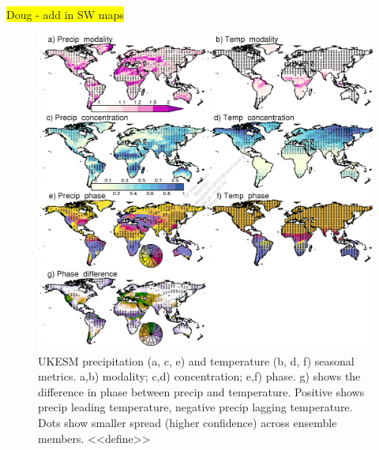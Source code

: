 \documentclass[bg, manuscript]{copernicus}
\newcommand{\hilight}[1]{\colorbox{yellow}{#1}}
\begin{document}
\hilight{Doug - add in SW maps}



\begin{figure}[t]
    \includegraphics[width=12cm]{figs/Climate/climStuff-UKESM.png}
    \caption{UKESM precipitation (a, c, e) and temperature (b, d, f) seasonal metrics. a,b) modality; c,d) concentration; e,f) phase. g) shows the difference in phase between precip and temperature. Positive shows precip leading temperature, negative precip lagging temperature. Dots show smaller spread (higher confidence) across ensemble members. <<define>>  \label{fig:ClimateSeasonUKESMmaps}}
\end{figure}
\end{document}
